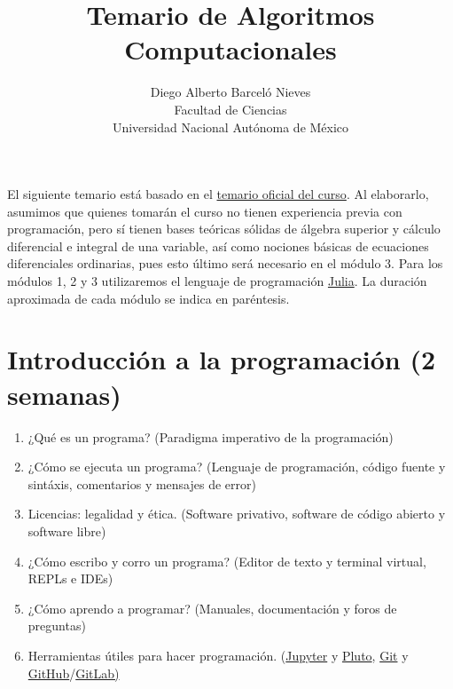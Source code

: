 \documentclass[a4paper]{article}
\begin{document}
\title{Temario de Algoritmos Computacionales}
\author{Diego Alberto Barceló Nieves \\ Facultad de Ciencias \\ Universidad Nacional Autónoma de México}
\date{}
\maketitle

El siguiente temario está basado en el \href{https://www.fciencias.unam.mx/estudiar-en-ciencias/estudios/licenciaturas/asignaturas/2016/1430}{temario oficial del curso}. Al elaborarlo, asumimos que quienes tomarán el curso no tienen experiencia previa con programación, pero sí tienen bases teóricas sólidas de álgebra superior y cálculo diferencial e integral de una variable, así como nociones básicas de ecuaciones diferenciales ordinarias, pues esto último será necesario en el módulo 3. Para los módulos 1, 2 y 3 utilizaremos el lenguaje de programación \href{https://julialang.org/}{Julia}. La duración aproximada de cada módulo se indica en paréntesis.

\setcounter{section}{-1}

\section{Introducción a la programación (2 semanas)} \label{Sec: Introducción a la programación (2 semanas)} 

\begin{enumerate}[label=\arabic*.]

    \item ¿Qué es un programa? (Paradigma imperativo de la programación)

    \item ¿Cómo se ejecuta un programa? (Lenguaje de programación, código fuente y sintáxis, comentarios y mensajes de error)
    \item Licencias: legalidad y ética. (Software privativo, software de código abierto y software libre)
    \item ¿Cómo escribo y corro un programa? (Editor de texto y terminal virtual, REPLs e IDEs)
    \item ¿Cómo aprendo a programar? (Manuales, documentación y foros de preguntas)
    \item Herramientas útiles para hacer programación. (\href{https://jupyter.org/}{Jupyter} y \href{https://github.com/fonsp/Pluto.jl/blob/main/README.md}{Pluto}, \href{https://git-scm.com/}{Git} y \href{https://github.com/}{GitHub}/\href{https://about.gitlab.com/}{GitLab)}
\end{enumerate}
\end{document}
